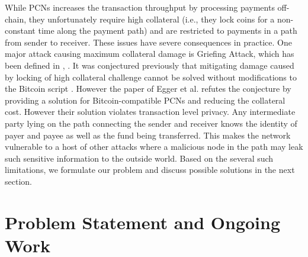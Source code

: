 \documentclass[10pt]{article}
\begin{document}
While PCNs increases the transaction throughput by processing payments off-chain, they unfortunately require high collateral (i.e., they lock coins for a non-constant time along the payment path) and are restricted to payments in a path from sender to receiver. These issues have severe consequences in practice. One major attack causing maximum collateral damage is Griefing Attack, which has been defined in \cite{eggeratomic}, \cite{attack}.  It was conjectured previously that mitigating damage caused by locking of high collateral challenge cannot be solved without modifications to the Bitcoin script \cite{miller2017sprites}. However the paper of Egger et al.\cite{eggeratomic} refutes the conjecture by providing a solution for Bitcoin-compatible PCNs and reducing the collateral cost. However their solution violates transaction level privacy. Any intermediate party lying on the path connecting the sender and receiver knows the identity of payer and payee as well as the fund being transferred. This makes the network vulnerable to a host of other attacks where a malicious node in the path may leak such sensitive information to the outside world. Based on the several such limitations, we formulate our problem and discuss possible solutions in the next section. 

\section{Problem Statement and Ongoing Work}
\end{document}
